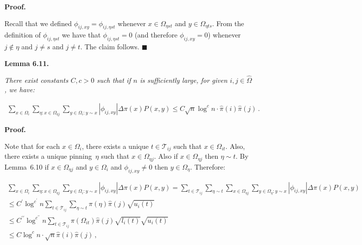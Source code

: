 \par\medskip\noindent\textbf{Proof.}\par



Recall that we defined $\phi_{ij,xy}=\phi_{ij,\eta st}$ whenever $x\in\Omega_{\eta st}$ and $y\in\Omega_{\eta ts}$. From the definition of $\phi_{ij,\eta st}$ we have that $\phi_{ij,\eta st}=0$ (and therefore $\phi_{ij,xy}=0$) whenever $j\notin\eta$ and $j\neq s$ and $j\neq t$. The claim follows.
\ensuremath{\blacksquare}\par






\par\medskip\noindent\textbf{\textbf{Lemma 6.11}\textbf{.}}\par



\emph{There exist constants $C,c>0$ such that if $n$ is sufficiently large, for given $i,j\in\hat{\Omega}$, we have:}\par


\[\begin{gathered}
\sum_{x\in\Omega_{i}}\sum_{\eta:x\in\Omega_{\eta j}}\sum_{y\in\Omega_{i}:y\sim x}|\phi_{ij,xy}|\Delta\pi(x)P(x,y)\leq C\sqrt{n}\log^{c}n\cdot\hat{\pi}(i)\hat{\pi}(j)\,.
\end{gathered}\]






\par\medskip\noindent\textbf{Proof.}\par



Note that for each $x\in\Omega_{i}$, there exists a unique $t\in\mathcal{T}_{ij}$ such that $x\in\Omega_{it}$. Also, there exists a unique pinning $\eta$ such that $x\in\Omega_{\eta j}$. Also if $x\in\Omega_{\eta j}$ then $\eta\sim t$. By Lemma 6.10 if $x\in\Omega_{\eta j}$ and $y\in\Omega_{i}$ and $\phi_{ij,xy}\neq 0$ then $y\in\Omega_{\eta}$. Therefore:\par


\[\begin{gathered}
\displaystyle\sum_{x\in\Omega_{i}}\sum_{\eta:x\in\Omega_{\eta j}}\sum_{y\in\Omega_{i}:y\sim x}|\phi_{ij,xy}|\Delta\pi(x)P(x,y) \displaystyle=\sum_{t\in\mathcal{T}_{ij}}\sum_{\eta\sim t}\sum_{x\in\Omega_{\eta j}}\sum_{y\in\Omega_{\eta}:y\sim x}|\phi_{ij,xy}|\Delta\pi(x)P(x,y) \\
\displaystyle\leq C^{\prime}\log^{c^{\prime}}n\sum_{t\in\mathcal{T}_{ij}}\sum_{\eta\sim t}\hat{\pi}(\eta)\hat{\pi}(j)\sqrt{u_{i}(t)} \\
\displaystyle\leq C^{\prime\prime}\log^{c^{\prime\prime}}n\sum_{t\in\mathcal{T}_{ij}}\pi(\Omega_{it})\hat{\pi}(j)\sqrt{l_{i}(t)}\sqrt{u_{i}(t)} \\
\displaystyle\leq C\log^{c}n\cdot\sqrt{n}\hat{\pi}(i)\hat{\pi}(j)\,,
\end{gathered}\]


